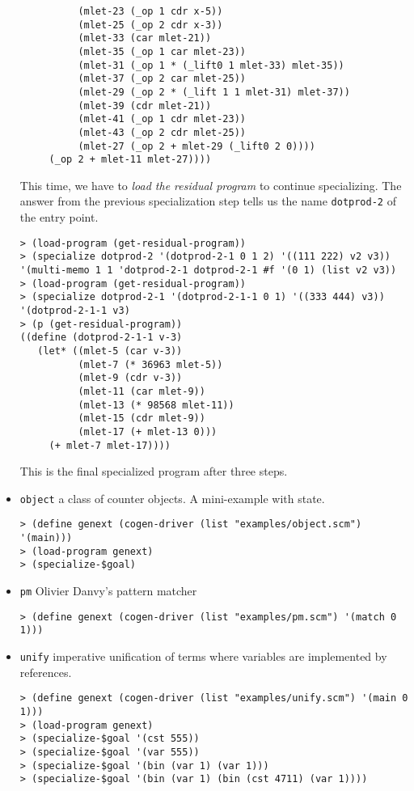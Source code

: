 \documentclass[11pt]{article}
\begin{document}
\begin{itemize}
\begin{small}
\begin{verbatim}
          (mlet-23 (_op 1 cdr x-5))
          (mlet-25 (_op 2 cdr x-3))
          (mlet-33 (car mlet-21))
          (mlet-35 (_op 1 car mlet-23))
          (mlet-31 (_op 1 * (_lift0 1 mlet-33) mlet-35))
          (mlet-37 (_op 2 car mlet-25))
          (mlet-29 (_op 2 * (_lift 1 1 mlet-31) mlet-37))
          (mlet-39 (cdr mlet-21))
          (mlet-41 (_op 1 cdr mlet-23))
          (mlet-43 (_op 2 cdr mlet-25))
          (mlet-27 (_op 2 + mlet-29 (_lift0 2 0))))
     (_op 2 + mlet-11 mlet-27))))
\end{verbatim}
  \end{small}
  This time, we have to \emph{load the residual program} to continue
  specializing. The answer from the previous specialization step tells
  us the name \texttt{dotprod-2} of the entry point.
  \begin{small}
\begin{verbatim}
> (load-program (get-residual-program))
> (specialize dotprod-2 '(dotprod-2-1 0 1 2) '((111 222) v2 v3))
'(multi-memo 1 1 'dotprod-2-1 dotprod-2-1 #f '(0 1) (list v2 v3))
> (load-program (get-residual-program))
> (specialize dotprod-2-1 '(dotprod-2-1-1 0 1) '((333 444) v3))
'(dotprod-2-1-1 v3)
> (p (get-residual-program))
((define (dotprod-2-1-1 v-3)
   (let* ((mlet-5 (car v-3))
          (mlet-7 (* 36963 mlet-5))
          (mlet-9 (cdr v-3))
          (mlet-11 (car mlet-9))
          (mlet-13 (* 98568 mlet-11))
          (mlet-15 (cdr mlet-9))
          (mlet-17 (+ mlet-13 0)))
     (+ mlet-7 mlet-17))))
\end{verbatim}
  \end{small}
  This is the final specialized program after three steps.
\item \texttt{object} a class of counter objects. A mini-example with
  state.
\begin{small}
\begin{verbatim}
> (define genext (cogen-driver (list "examples/object.scm") '(main)))
> (load-program genext)
> (specialize-$goal)
\end{verbatim}
\end{small}
\item \texttt{pm} Olivier Danvy's pattern matcher \cite{Danvy1991}
  \begin{small}
\begin{verbatim}
> (define genext (cogen-driver (list "examples/pm.scm") '(match 0 1)))
\end{verbatim}
  \end{small}
\item \texttt{unify} imperative unification of terms where variables
  are implemented by references.
  \begin{small}
\begin{verbatim}
> (define genext (cogen-driver (list "examples/unify.scm") '(main 0 1)))
> (load-program genext)
> (specialize-$goal '(cst 555))
> (specialize-$goal '(var 555))
> (specialize-$goal '(bin (var 1) (var 1)))
> (specialize-$goal '(bin (var 1) (bin (cst 4711) (var 1))))
\end{verbatim}
  \end{small}
\end{itemize}
\end{document}
